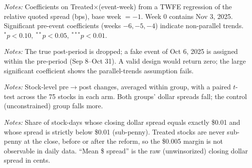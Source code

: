 \documentclass[12pt]{article}
\begin{document}
\begin{table}[htbp]\centering
\begin{threeparttable}
\caption{Event-study: weekly DiD coefficients}\label{tab:eventstudy}
\small

\begin{tablenotes}\small
\item \textit{Notes:} Coefficients on Treated$\times$(event-week) from a TWFE regression of
the relative quoted spread (bps), base week $=-1$. Week 0 contains Nov 3, 2025. Significant
pre-event coefficients (weeks $-6,-5,-4$) indicate non-parallel trends.
$^{*}p<0.10,\ ^{**}p<0.05,\ ^{***}p<0.01$.
\end{tablenotes}
\end{threeparttable}
\end{table}

\begin{table}[htbp]\centering
\begin{threeparttable}
\caption{Placebo: fake event inside the pre-period}\label{tab:placebo}
\small

\begin{tablenotes}\small
\item \textit{Notes:} The true post-period is dropped; a fake event of Oct 6, 2025 is
assigned within the pre-period (Sep 8--Oct 31). A valid design would return zero; the large
significant coefficient shows the parallel-trends assumption fails.
\end{tablenotes}
\end{threeparttable}
\end{table}

\begin{table}[htbp]\centering
\begin{threeparttable}
\caption{Within-group pre/post changes (description)}\label{tab:withingroup}
\small

\begin{tablenotes}\small
\item \textit{Notes:} Stock-level pre$\to$post changes, averaged within group, with a paired
$t$-test across the 75 stocks in each arm. Both groups' dollar spreads fall; the control
(unconstrained) group falls more.
\end{tablenotes}
\end{threeparttable}
\end{table}

\begin{table}[htbp]\centering
\begin{threeparttable}
\caption{Penny-grid censoring of the daily closing quote (mechanism)}\label{tab:censoring}
\small

\begin{tablenotes}\small
\item \textit{Notes:} Share of stock-days whose closing dollar spread equals exactly \$0.01
and whose spread is strictly below \$0.01 (sub-penny). Treated stocks are never sub-penny at
the close, before or after the reform, so the \$0.005 margin is not observable in daily
data. ``Mean \$ spread'' is the raw (unwinsorized) closing dollar spread in cents.
\end{tablenotes}
\end{threeparttable}
\end{table}
\end{document}
